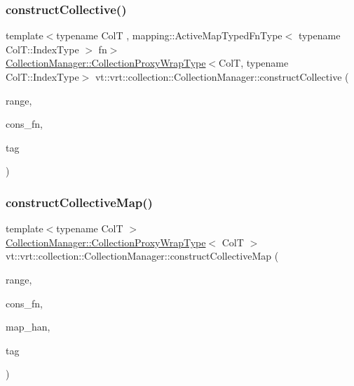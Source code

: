 \subsubsection{\texorpdfstring{construct\+Collective()}{constructCollective()}\hspace{0.1cm}{\footnotesize\ttfamily [3/3]}}
{\footnotesize\ttfamily template$<$typename ColT , mapping\+::\+Active\+Map\+Typed\+Fn\+Type$<$ typename Col\+T\+::\+Index\+Type $>$ fn$>$ \\
\hyperlink{structvt_1_1vrt_1_1collection_1_1_collection_manager_a56458ed7f9bb22b631b9b3a745f42f94}{Collection\+Manager\+::\+Collection\+Proxy\+Wrap\+Type}$<$ColT, typename Col\+T\+::\+Index\+Type$>$ vt\+::vrt\+::collection\+::\+Collection\+Manager\+::construct\+Collective (\begin{DoxyParamCaption}\item[{typename Col\+T\+::\+Index\+Type}]{range,  }\item[{\hyperlink{structvt_1_1vrt_1_1collection_1_1_collection_manager_a7503830bc133013d542856fa39834dcc}{Distrib\+Construct\+Fn}$<$ ColT $>$}]{cons\+\_\+fn,  }\item[{\hyperlink{namespacevt_a84ab281dae04a52a4b243d6bf62d0e52}{Tag\+Type} const \&}]{tag }\end{DoxyParamCaption})}

\mbox{\label{structvt_1_1vrt_1_1collection_1_1_collection_manager_ae4f96ce01b13d68e5f3a8be7bea7e439}} 
\subsubsection{\texorpdfstring{construct\+Collective\+Map()}{constructCollectiveMap()}}
{\footnotesize\ttfamily template$<$typename ColT $>$ \\
\hyperlink{structvt_1_1vrt_1_1collection_1_1_collection_manager_a56458ed7f9bb22b631b9b3a745f42f94}{Collection\+Manager\+::\+Collection\+Proxy\+Wrap\+Type}$<$ ColT $>$ vt\+::vrt\+::collection\+::\+Collection\+Manager\+::construct\+Collective\+Map (\begin{DoxyParamCaption}\item[{typename Col\+T\+::\+Index\+Type}]{range,  }\item[{\hyperlink{structvt_1_1vrt_1_1collection_1_1_collection_manager_a7503830bc133013d542856fa39834dcc}{Distrib\+Construct\+Fn}$<$ ColT $>$}]{cons\+\_\+fn,  }\item[{\hyperlink{namespacevt_af64846b57dfcaf104da3ef6967917573}{Handler\+Type} const \&}]{map\+\_\+han,  }\item[{\hyperlink{namespacevt_a84ab281dae04a52a4b243d6bf62d0e52}{Tag\+Type} const \&}]{tag }\end{DoxyParamCaption})}

